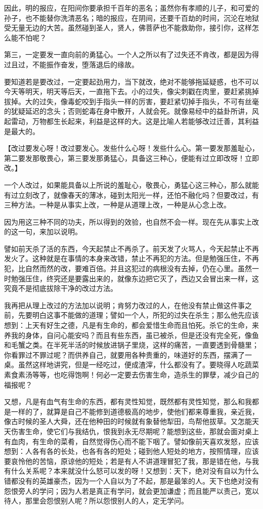 \documentclass[12pt,twoside,openany]{book}
\newcommand{\kai}[1]{{\CJKfamily{kai}#1}}
\begin{document}
因此，明的报应，在阳间你要承担千百年的恶名；虽然你有孝顺的儿子，和可爱的孙子，也不能替你洗清恶名；暗的报应，在阴间，还要千百劫的时间，沉沦在地狱受无量无边的大苦。虽然碰到圣人，贤人，佛菩萨也不能救助你，接引你，这样怎么能不怕呢？

第三，一定要发一直向前的勇猛心。一个人之所以有了过失还不肯改，都是因为得过且过，不能振作奋发，堕落退后的缘故。

要知道若是要改过，一定要起劲用力，当下就改，绝对不能够拖延疑惑，也不可以今天等明天，明天等后天，一直拖下去。小的过失，像尖刺戳在肉里，要赶紧挑掉拔掉。大的过失，像毒蛇咬到手指头一样的厉害，要赶紧切掉手指头，不可有丝毫的犹疑延迟的念头；否则蛇毒在身中散开，人就会死。就像易经中的益卦所讲，风起雷动，万物都生长起来，利益是这样的大。这是比喻人若能够改过迁善，其利益是最大的。

【\kai{改过要发心呀！改过要发心。发些什么心呀！发些什么心。第一要发那羞耻心，第二要发那敬畏心，第三要发那勇猛心，具备这三种心，便能有过立即改呀！立即改。}】

一个人改过，如果能具备以上所说的羞耻心，敬畏心，勇猛心这三种心，那么就能有过立刻改了，就像春天的薄冰，碰到太阳光一样，还怕不融化吗？但要改过，有三种方法。一种是从事实上改，一种是从道理上改，一种是从心念上改。

因为用这三种不同的功夫，所以得到的效验，也自然不会一样。现在先从事实上改的这一句，来加以说明。

譬如前天杀了活的东西，今天起禁止不再杀了。前天发了火骂人，今天起禁止不再发火了。这种就是在事情的本身来改错，禁止不再犯的方法。但是勉强压住，不再犯，比自然而然的改，要难百倍。并且这犯过的病根没有去掉，仍在心里。虽然一时勉强压住，终究还是要露出来的，就像东边把它灭了，西边又会冒出来一样，这究竟不是彻底拔除干净的改过方法。

我再把从理上改过的方法加以说明；肯努力改过的人，在他没有禁止做这件事之前，先要明白这事不能做的道理；譬如一个人，所犯的过失在杀生；那么他先应该想到：上天有好生之德，凡是有生命的，都会爱惜生命而且怕死。杀它的生命，来养我的身体，自问心能安吗？而且有些东西，虽已被杀，但是还没有完全死，像鱼和毛蟹之类。在半死半活的时候放进锅子里烧，这样的痛苦，一直要透到骨髓里；你看罪过不罪过呢？而供养自己，就要用各种贵重的，味道好的东西，摆满了一桌。虽然这样地讲究，但是一经吃过，便成渣滓，什么都没有了。要晓得人吃蔬菜素食素汤等等，也吃得饱啊！何必一定要去伤害生命，造杀生的罪孽，减少自己的福报呢？

又想，凡是有血气有生命的东西，都有灵性知觉，既然都有灵性知觉，那么和我都是一样的了，就算是自己不能修到道德极高的地步，使他们都来尊重我，亲近我，像古时候的圣人大舜，还在他种田的时候就有象替他犁田，鸟帮他拔草。又怎能天天伤害生命，使它们与我结仇，恨我到永无尽期呢？能想到这些，那就会面对桌上有血肉，有生命的菜肴，自然觉得伤心而不能下咽了。譬如像前天喜欢发怒，应该想到：人各有各的长处，也各有各的短处；碰到他人短处的地方，按照情理，应该要哀怜他的苦恼，原谅他的短处；若是有人不讲道理冒犯了我，那是错在他，与我有什么关系呢？本来就没什么怒可以发的呀！又想到：天下，绝对没有自以为什么错都没有的英雄豪杰，因为一个人自以为了不起，那是最笨的人。天下也绝对没有怨恨旁人的学问；因为人若是真正有学问，就会更加谦虚；而且能严以责己，宽以待人，那里会怨恨别人呢？所以怨恨别人的人，定无学问。
\end{document}
